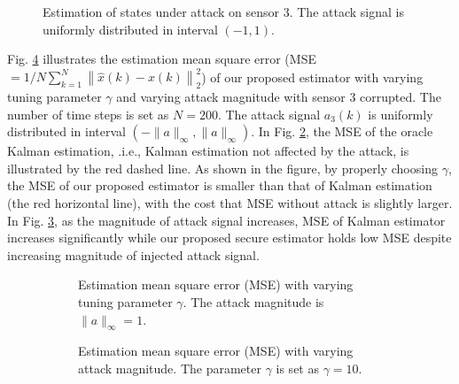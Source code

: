 \documentclass[12pt]{article}  %
\newcommand{\ift}{{\infty}}
\begin{document}
\begin{figure}[ht]
	\centering
	
	\caption{Estimation of states under attack on sensor 3. The attack signal is uniformly distributed in interval $(-1,1)$.  } \label{fig:close_loop_attack}
\end{figure}





Fig. \ref{fig:MSE} illustrates the estimation mean square error (MSE$=1/N\sum_{k=1}^{N}\left\|\hat{x}(k)-x(k)\right\|_2^2$) of our proposed estimator with varying tuning parameter $\gamma$ and varying attack magnitude with sensor 3 corrupted. 
The number of time steps is set as $N=200$.
The attack signal $a_3(k)$ is uniformly distributed in interval $(-\|a\|_\ift,\|a\|_\ift)$.
In Fig. \ref{fig:MSE_gamma}, the MSE of the oracle Kalman estimation, .i.e., Kalman estimation not affected by the attack, is illustrated by the red dashed line.
As shown in the figure, by properly choosing $\gamma$, the MSE of our proposed estimator is smaller than that of Kalman estimation (the red horizontal line), with the cost that MSE without attack is slightly larger. 
In Fig. \ref{fig:MSE_mag}, as the magnitude of attack signal increases, MSE of Kalman estimator increases significantly while our proposed secure estimator holds low MSE despite increasing magnitude of injected attack signal.
%
%	
%

\begin{figure}[ht]
	\centering
	\begin{subfigure}{.48\textwidth}
		\centering
		
		\caption{Estimation mean square error (MSE) with varying tuning parameter $\gamma$. The attack magnitude is $\|a\|_\ift=1$.  } \label{fig:MSE_gamma}
	\end{subfigure}
\hspace{5pt}
	\begin{subfigure}{.48\textwidth}
		\centering
		
		\caption{Estimation mean square error (MSE) with varying attack magnitude. The parameter $\gamma$ is set as $\gamma=10$. } \label{fig:MSE_mag}
	\end{subfigure}
	\caption{}
	\label{fig:MSE}
\end{figure}
\end{document}
